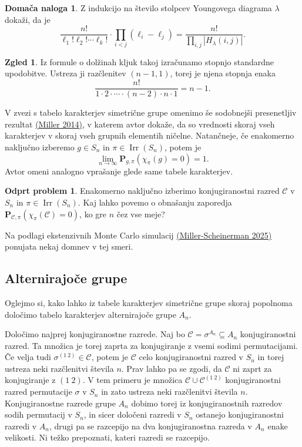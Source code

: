 \documentclass[11pt]{book}
\def\conclass{\mathcal{C}}
\def\PP{\mathbf{P}}
\DeclareMathOperator\Irr{Irr}
\theoremstyle{definition}
\theoremstyle{zgled}
\newtheorem{zgled}[theorem]{Zgled}
\theoremstyle{zgledbrezstevilke}
\theoremstyle{odprtproblem}
\newtheorem{odprtproblem}[theorem]{Odprt problem}
\theoremstyle{domacanaloga}
\newtheorem{domacanaloga}[theorem]{Domača naloga}
\theoremstyle{izrek}
\begin{document}
\begin{domacanaloga}
Z indukcijo na število stolpcev Youngovega diagrama $\lambda$ dokaži, da je
\[
    \frac{n!}{\ell_1! \ell_2! \cdots \ell_k!} \cdot \prod_{i < j} (\ell_i - \ell_j) = \frac{n!}{\prod_{i,j}|H_{\lambda}(i,j)|}.
\]
\end{domacanaloga}

\begin{zgled}
Iz formule o dolžinah kljuk takoj izračunamo stopnjo standardne upodobitve. Ustreza ji razčlenitev $(n-1,1)$, torej je njena stopnja enaka
\[
    \frac{n!}{1 \cdot 2 \cdot \cdots \cdot (n-2) \cdot n \cdot 1} = n-1.
\]
\end{zgled}

V zvezi s tabelo karakterjev simetrične grupe omenimo še sodobnejši presenetljiv rezultat \href{https://link.springer.com/article/10.1007/s00209-014-1290-x}{(Miller 2014)}, v katerem avtor dokaže, da so vrednosti skoraj vseh karakterjev v skoraj vseh grupnih elementih ničelne. Natančneje, če enakomerno naključno izberemo $g \in S_n$ in $\pi \in \Irr(S_n)$, potem je
\[
    \lim_{n \to \infty} \PP_{g, \pi}\left(\chi_{\pi}(g) = 0\right) = 1.
\]
Avtor omeni analogno vprašanje glede same tabele karakterjev.

\begin{odprtproblem}
Enakomerno naključno izberimo konjugiranostni razred $\conclass$ v $S_n$ in $\pi \in \Irr(S_n)$. Kaj lahko povemo o obnašanju zaporedja $\PP_{\conclass, \pi}\left( \chi_{\pi}(\conclass) = 0 \right)$, ko gre $n$ čez vse meje?
\end{odprtproblem}

Na podlagi ekstenzivnih Monte Carlo simulacij \href{https://www.ams.org/journals/mcom/2025-94-351/S0025-5718-2024-03964-9/}{(Miller-Scheinerman 2025)} ponujata nekaj domnev v tej smeri.

\subsection{Alternirajoče grupe}

Oglejmo si, kako lahko iz tabele karakterjev simetrične grupe skoraj popolnoma določimo tabelo karakterjev alternirajoče grupe $A_n$.

Določimo najprej konjugiranostne razrede. Naj bo $\conclass = \sigma^{A_n} \subseteq A_n$ konjugiranostni razred. Ta množica je torej zaprta za konjugiranje z vsemi sodimi permutacijami. Če velja tudi $\sigma^{(1 \ 2)} \in \conclass$, potem je $\conclass$ celo konjugiranostni razred v $S_n$ in torej ustreza neki razčlenitvi števila $n$. Prav lahko pa se zgodi, da $\conclass$ ni zaprt za konjugiranje z $(1 \ 2)$. V tem primeru je množica $\conclass \cup \conclass^{(1 \ 2)}$ konjugiranostni razred permutacije $\sigma$ v $S_n$ in zato ustreza neki razčlenitvi števila $n$. Konjugiranostne razrede grupe $A_n$ dobimo torej iz konjugiranostnih razredov sodih permutacij v $S_n$, in sicer določeni razredi v $S_n$ ostanejo konjugiranostni razredi v $A_n$, drugi pa se razcepijo na dva konjugiranostna razreda v $A_n$ enake velikosti. Ni težko prepoznati, kateri razredi se razcepijo.
\end{document}
